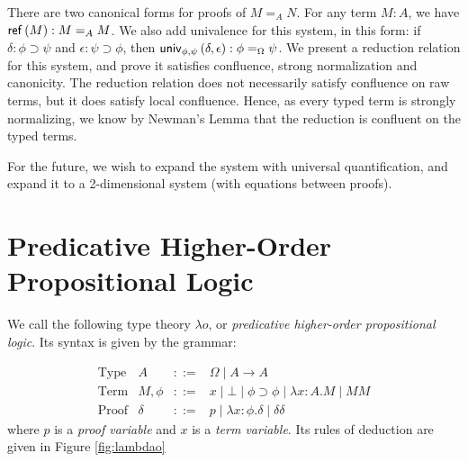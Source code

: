 There are two canonical forms for proofs of $M =_A N$.  For any term $M : A$, we have $\mathsf{ref} \left( {M} \right) : M =_A M$.  We also add univalence for this system, in this form:
if $\delta : \phi \supset \psi$ and $\epsilon : \psi \supset\phi$, then $\mathsf{univ}_{{\phi} , {\psi}} \left( {\delta} , {\epsilon} \right) : \phi =_\Omega \psi$.  We present a reduction relation for this system, and prove it satisfies confluence, strong normalization and canonicity.   The reduction relation does not necessarily satisfy confluence on raw terms, but it does satisfy local confluence.  Hence, as
every typed term is strongly normalizing, we know by Newman's Lemma that the reduction is confluent on the typed terms.

For the future, we wish to expand the system with universal quantification, and expand it to a 2-dimensional system (with equations between proofs).


\section{Predicative Higher-Order Propositional Logic}

We call the following type theory $\lambda o$, or \emph{predicative higher-order propositional logic}.  Its
syntax is given by the grammar:

\[
\begin{array}{lrcl}
\text{Type} & A & ::= & \Omega \mid A \rightarrow A \\
\text{Term} & M, \phi & ::= & x \mid \bot \mid \phi \supset\phi \mid \lambda x:A.M \mid MM \\
\text{Proof} & \delta & ::= & p \mid \lambda x:\phi.\delta \mid \delta \delta
\end{array}
\]
where $p$ is a \emph{proof variable} and $x$ is a \emph{term variable}.
Its rules of deduction are given in Figure \ref{fig:lambdao}

